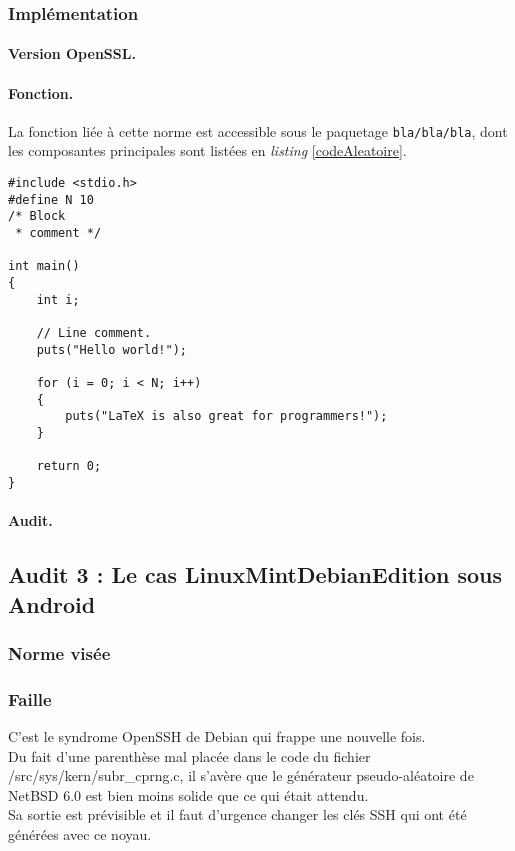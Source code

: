 	
	\subsubsection{Implémentation}
		
		\paragraph{Version OpenSSL.\\}
		
		\paragraph{Fonction.\\}
		La fonction liée à cette norme est accessible sous le paquetage \texttt{bla/bla/bla}, dont les composantes principales sont listées en \textit{listing} \ref{codeAleatoire}.
		
		
		\begin{lstlisting}[style=customc,caption=codeAleatoire.c, label=codeAleatoire]
#include <stdio.h>
#define N 10
/* Block
 * comment */
 
int main()
{
    int i;
 
    // Line comment.
    puts("Hello world!");
 
    for (i = 0; i < N; i++)
    {
        puts("LaTeX is also great for programmers!");
    }
 
    return 0;
}
		\end{lstlisting}
		
		
		
		\paragraph{Audit.\\}

	\subsection{Audit 3 : Le cas LinuxMintDebianEdition sous Android}
	\subsubsection{Norme visée}
	\subsubsection{Faille}
	
	C'est le syndrome OpenSSH de Debian qui frappe une nouvelle fois.\\
	Du fait d'une parenthèse mal placée dans le code du fichier 
	/src/sys/kern/subr\_cprng.c, il s'avère que le générateur pseudo-aléatoire 
	de NetBSD 6.0 est bien moins solide que ce qui était attendu.\\
	Sa sortie est prévisible et il faut d'urgence changer les clés SSH qui ont été générées avec ce noyau.\\
	

